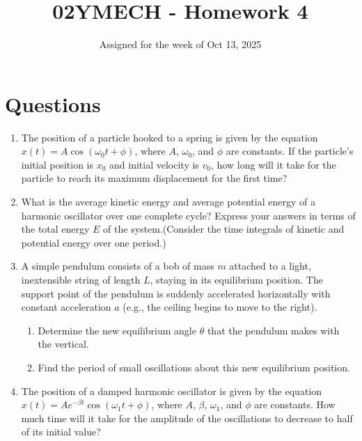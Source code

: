 \documentclass[12pt]{article}
\title{02YMECH - Homework 4}
\date{Assigned for the week of Oct 13, 2025}
\author{}
\begin{document}
\maketitle

\section*{Questions}

\begin{enumerate}
    \item The position of a particle hooked to a spring is given by the equation \( x(t)=A \cos(\omega_0 t + \phi) \), where \( A \), \( \omega_0 \), and \( \phi \) are constants. If the particle's initial position is $x_0$ and initial velocity is $v_0$, how long will it take for the particle to reach its maximum displacement for the first time?
    \item What is the average kinetic energy and average potential energy of a harmonic oscillator over one complete cycle? Express your answers in terms of the total energy \( E \) of the system.(Consider the time integrals of kinetic and potential energy over one period.)
    \item A simple pendulum consists of a bob of mass $m$ attached to a light, inextensible string of length $L$, staying in its equilibrium position. The support point of the pendulum is suddenly accelerated horizontally with constant acceleration $a$ (e.g., the ceiling begins to move to the right). 
    \begin{enumerate}
        \item Determine the new equilibrium angle \( \theta \) that the pendulum makes with the vertical.
        \item Find the period of small oscillations about this new equilibrium position.
    \end{enumerate}
    \item The position of a damped harmonic oscillator is given by the equation \( x(t) = A e^{-\beta t} \cos(\omega_1 t + \phi) \), where \( A \), \( \beta \), \( \omega_1 \), and \( \phi \) are constants. How much time will it take for the amplitude of the oscillations to decrease to half of its initial value?

\end{enumerate}
\end{document}
